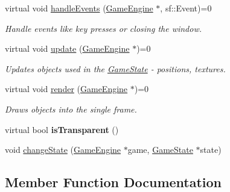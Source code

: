 \begin{DoxyCompactItemize}
virtual void \mbox{\hyperlink{class_game_state_a3ef0638514dbfe71581d593cf0f66ce5}{handle\+Events}} (\mbox{\hyperlink{class_game_engine}{Game\+Engine}} $\ast$, sf\+::\+Event)=0
\begin{DoxyCompactList}\small\item\em Handle events like key presses or closing the window. \end{DoxyCompactList}\item 
\mbox{\label{class_game_state_a66b11afe355a9479f94aaf76576980bd}} 
virtual void \mbox{\hyperlink{class_game_state_a66b11afe355a9479f94aaf76576980bd}{update}} (\mbox{\hyperlink{class_game_engine}{Game\+Engine}} $\ast$)=0
\begin{DoxyCompactList}\small\item\em Updates objects used in the \mbox{\hyperlink{class_game_state}{Game\+State}} -\/ positions, textures. \end{DoxyCompactList}\item 
\mbox{\label{class_game_state_a0d56cd5355f59a87cf95e1c6d719f329}} 
virtual void \mbox{\hyperlink{class_game_state_a0d56cd5355f59a87cf95e1c6d719f329}{render}} (\mbox{\hyperlink{class_game_engine}{Game\+Engine}} $\ast$)=0
\begin{DoxyCompactList}\small\item\em Draws objects into the single frame. \end{DoxyCompactList}\item 
\mbox{\label{class_game_state_af75d6db30190901ed70704d18804fac7}} 
virtual bool {\bfseries is\+Transparent} ()
\item 
void \mbox{\hyperlink{class_game_state_a5f4ffcaa495af37ba423627e3f961fdb}{change\+State}} (\mbox{\hyperlink{class_game_engine}{Game\+Engine}} $\ast$game, \mbox{\hyperlink{class_game_state}{Game\+State}} $\ast$state)
\end{DoxyCompactItemize}


\subsection{Member Function Documentation}
\mbox{\label{class_game_state_a5f4ffcaa495af37ba423627e3f961fdb}} 

